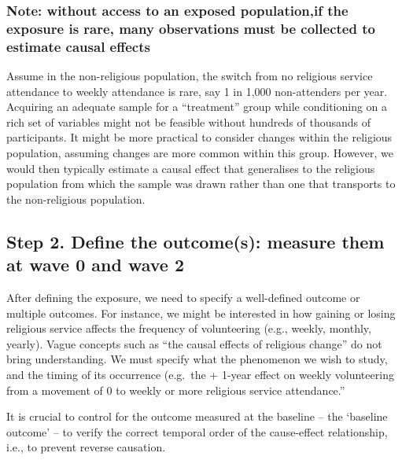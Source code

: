 \documentclass[
  singlecolumn]{report}
\begin{document}
\hypertarget{note-without-access-to-an-exposed-populationif-the-exposure-is-rare-many-observations-must-be-collected-to-estimate-causal-effects}{%
\subsubsection{\texorpdfstring{\textbf{Note: without access to an
exposed population,if the exposure is rare, many observations must be
collected to estimate causal
effects}}{Note: without access to an exposed population,if the exposure is rare, many observations must be collected to estimate causal effects}}\label{note-without-access-to-an-exposed-populationif-the-exposure-is-rare-many-observations-must-be-collected-to-estimate-causal-effects}}

Assume in the non-religious population, the switch from no religious
service attendance to weekly attendance is rare, say 1 in 1,000
non-attenders per year. Acquiring an adequate sample for a ``treatment''
group while conditioning on a rich set of variables might not be
feasible without hundreds of thousands of participants. It might be more
practical to consider changes within the religious population, assuming
changes are more common within this group. However, we would then
typically estimate a causal effect that generalises to the religious
population from which the sample was drawn rather than one that
transports to the non-religious population.

\hypertarget{step-2.-define-the-outcomes-measure-them-at-wave-0-and-wave-2}{%
\subsection{Step 2. Define the outcome(s): measure them at wave 0 and
wave
2}\label{step-2.-define-the-outcomes-measure-them-at-wave-0-and-wave-2}}

After defining the exposure, we need to specify a well-defined outcome
or multiple outcomes. For instance, we might be interested in how
gaining or losing religious service affects the frequency of
volunteering (e.g., weekly, monthly, yearly). Vague concepts such as
``the causal effects of religious change'' do not bring understanding.
We must specify what the phenomenon we wish to study, and the timing of
its occurrence (e.g.~the + 1-year effect on weekly volunteering from a
movement of 0 to weekly or more religious service attendance.''

It is crucial to control for the outcome measured at the baseline -- the
`baseline outcome' -- to verify the correct temporal order of the
cause-effect relationship, i.e., to prevent reverse causation.
\end{document}
